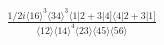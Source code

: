 \documentclass[varwidth, border=5pt]{standalone}
\begin{document}
\begin{my}
$\begin{gathered}
\scriptscriptstyle\frac{1/2i\langle16\rangle^3\langle34\rangle^3\langle1|2+3|4]\langle4|2+3|1]}{\langle12\rangle\langle14\rangle^4\langle23\rangle\langle45\rangle\langle56\rangle}
\end{gathered}$
\end{my}
\end{document}
